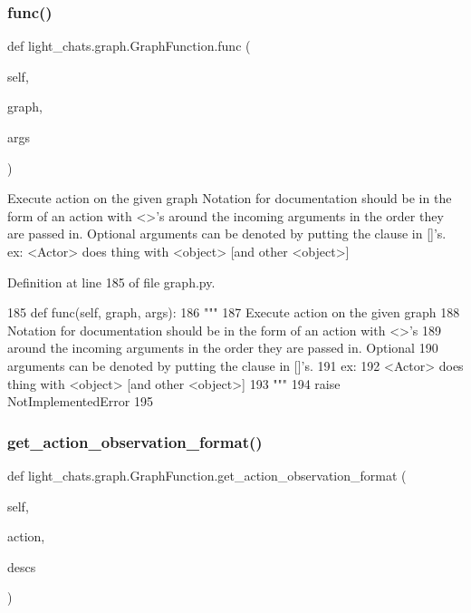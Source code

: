 \subsubsection{\texorpdfstring{func()}{func()}}
{\footnotesize\ttfamily def light\+\_\+chats.\+graph.\+Graph\+Function.\+func (\begin{DoxyParamCaption}\item[{}]{self,  }\item[{}]{graph,  }\item[{}]{args }\end{DoxyParamCaption})}

\begin{DoxyVerb}Execute action on the given graph
Notation for documentation should be in the form of an action with <>'s
around the incoming arguments in the order they are passed in. Optional
arguments can be denoted by putting the clause in []'s.
ex:
<Actor> does thing with <object> [and other <object>]
\end{DoxyVerb}
 

Definition at line 185 of file graph.\+py.


\begin{DoxyCode}
185     \textcolor{keyword}{def }func(self, graph, args):
186         \textcolor{stringliteral}{"""}
187 \textcolor{stringliteral}{        Execute action on the given graph}
188 \textcolor{stringliteral}{        Notation for documentation should be in the form of an action with <>'s}
189 \textcolor{stringliteral}{        around the incoming arguments in the order they are passed in. Optional}
190 \textcolor{stringliteral}{        arguments can be denoted by putting the clause in []'s.}
191 \textcolor{stringliteral}{        ex:}
192 \textcolor{stringliteral}{        <Actor> does thing with <object> [and other <object>]}
193 \textcolor{stringliteral}{        """}
194         \textcolor{keywordflow}{raise} NotImplementedError
195 
\end{DoxyCode}
\mbox{\label{classlight__chats_1_1graph_1_1GraphFunction_a8828c59ad0d9f53bfb2234f0b8b37377}} 
\subsubsection{\texorpdfstring{get\+\_\+action\+\_\+observation\+\_\+format()}{get\_action\_observation\_format()}}
{\footnotesize\ttfamily def light\+\_\+chats.\+graph.\+Graph\+Function.\+get\+\_\+action\+\_\+observation\+\_\+format (\begin{DoxyParamCaption}\item[{}]{self,  }\item[{}]{action,  }\item[{}]{descs }\end{DoxyParamCaption})}

